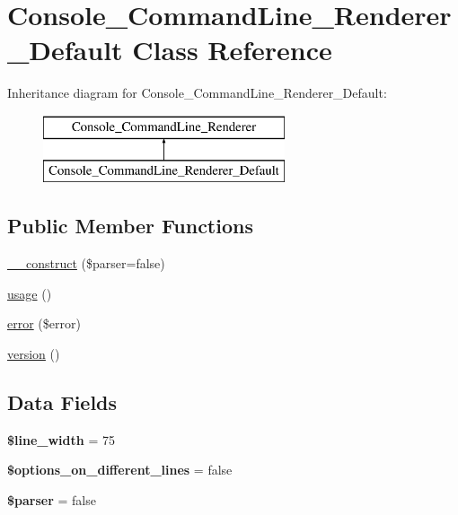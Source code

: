 \hypertarget{class_console___command_line___renderer___default}{
\section{Console\_\-CommandLine\_\-Renderer\_\-Default Class Reference}
\label{class_console___command_line___renderer___default}
}
Inheritance diagram for Console\_\-CommandLine\_\-Renderer\_\-Default:\begin{figure}[H]
\begin{center}
\leavevmode
\includegraphics[height=2.000000cm]{class_console___command_line___renderer___default}
\end{center}
\end{figure}
\subsection*{Public Member Functions}
\begin{DoxyCompactItemize}
\item 
\hyperlink{class_console___command_line___renderer___default_aa7850edce08c23778ec8f9ce1eb972f1}{\_\-\_\-construct} (\$parser=false)
\item 
\hyperlink{class_console___command_line___renderer___default_afe55eae96aed06d16232a3b56fcf1ad3}{usage} ()
\item 
\hyperlink{class_console___command_line___renderer___default_a02345776b3d51e94d7639121e23a2fad}{error} (\$error)
\item 
\hyperlink{class_console___command_line___renderer___default_a6080dae0886626b9a4cedb29240708b1}{version} ()
\end{DoxyCompactItemize}
\subsection*{Data Fields}
\begin{DoxyCompactItemize}
\item 
\hypertarget{class_console___command_line___renderer___default_ab059678922a8e0657f4581a1c98c3479}{
{\bfseries \$line\_\-width} = 75}
\label{class_console___command_line___renderer___default_ab059678922a8e0657f4581a1c98c3479}

\item 
\hypertarget{class_console___command_line___renderer___default_a324c2eb2f2bb18e6a3bb0ef6064c49d9}{
{\bfseries \$options\_\-on\_\-different\_\-lines} = false}
\label{class_console___command_line___renderer___default_a324c2eb2f2bb18e6a3bb0ef6064c49d9}

\item 
\hypertarget{class_console___command_line___renderer___default_a147a766daa03d52576c7345fea31c945}{
{\bfseries \$parser} = false}
\label{class_console___command_line___renderer___default_a147a766daa03d52576c7345fea31c945}

\end{DoxyCompactItemize}
